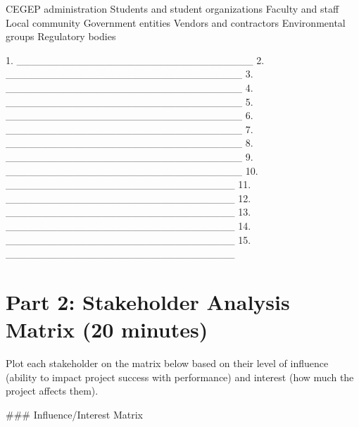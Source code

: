 \documentclass[letterpaper,10pt,english]{sphinxmanual}
\begin{document}
\sphinxAtStartPar
{}
\sphinxhyphen{} CEGEP administration
\sphinxhyphen{} Students and student organizations
\sphinxhyphen{} Faculty and staff
\sphinxhyphen{} Local community
\sphinxhyphen{} Government entities
\sphinxhyphen{} Vendors and contractors
\sphinxhyphen{} Environmental groups
\sphinxhyphen{} Regulatory bodies

\sphinxAtStartPar
{}
1. \_\_\_\_\_\_\_\_\_\_\_\_\_\_\_\_\_\_\_\_\_\_\_\_\_\_\_\_\_\_\_\_
2. \_\_\_\_\_\_\_\_\_\_\_\_\_\_\_\_\_\_\_\_\_\_\_\_\_\_\_\_\_\_\_\_
3. \_\_\_\_\_\_\_\_\_\_\_\_\_\_\_\_\_\_\_\_\_\_\_\_\_\_\_\_\_\_\_\_
4. \_\_\_\_\_\_\_\_\_\_\_\_\_\_\_\_\_\_\_\_\_\_\_\_\_\_\_\_\_\_\_\_
5. \_\_\_\_\_\_\_\_\_\_\_\_\_\_\_\_\_\_\_\_\_\_\_\_\_\_\_\_\_\_\_\_
6. \_\_\_\_\_\_\_\_\_\_\_\_\_\_\_\_\_\_\_\_\_\_\_\_\_\_\_\_\_\_\_\_
7. \_\_\_\_\_\_\_\_\_\_\_\_\_\_\_\_\_\_\_\_\_\_\_\_\_\_\_\_\_\_\_\_
8. \_\_\_\_\_\_\_\_\_\_\_\_\_\_\_\_\_\_\_\_\_\_\_\_\_\_\_\_\_\_\_\_
9. \_\_\_\_\_\_\_\_\_\_\_\_\_\_\_\_\_\_\_\_\_\_\_\_\_\_\_\_\_\_\_\_
10. \_\_\_\_\_\_\_\_\_\_\_\_\_\_\_\_\_\_\_\_\_\_\_\_\_\_\_\_\_\_\_
11. \_\_\_\_\_\_\_\_\_\_\_\_\_\_\_\_\_\_\_\_\_\_\_\_\_\_\_\_\_\_\_
12. \_\_\_\_\_\_\_\_\_\_\_\_\_\_\_\_\_\_\_\_\_\_\_\_\_\_\_\_\_\_\_
13. \_\_\_\_\_\_\_\_\_\_\_\_\_\_\_\_\_\_\_\_\_\_\_\_\_\_\_\_\_\_\_
14. \_\_\_\_\_\_\_\_\_\_\_\_\_\_\_\_\_\_\_\_\_\_\_\_\_\_\_\_\_\_\_
15. \_\_\_\_\_\_\_\_\_\_\_\_\_\_\_\_\_\_\_\_\_\_\_\_\_\_\_\_\_\_\_

\sphinxAtStartPar
{}


\section{Part 2: Stakeholder Analysis Matrix (20 minutes)}
\label{\detokenize{mapping_stakeholder:part-2-stakeholder-analysis-matrix-20-minutes}}
\sphinxAtStartPar
{} Plot each stakeholder on the matrix below based on their level of influence (ability to impact project success with performance) and interest (how much the project affects them).

\sphinxAtStartPar
\#\#\# Influence/Interest Matrix

\sphinxAtStartPar
{}
\end{document}
